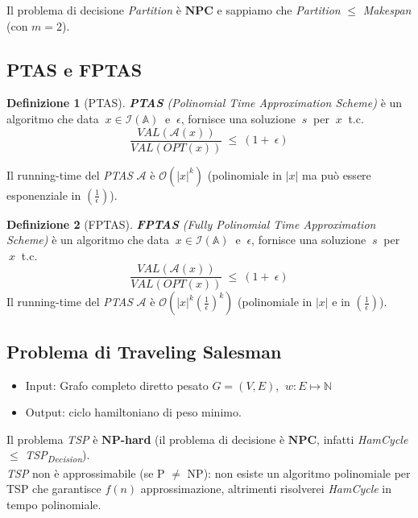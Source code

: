 \documentclass[a4paper]{article}
\theoremstyle{definition}
\newtheorem{definit}{Definizione}[subsection]
\newcommand{\N}{\mathbb{N}}
\newcommand{\np}{\mathbf{NP}}
\newcommand{\npc}{\mathbf{NPC}}
\begin{document}
	\noindent
	Il problema di decisione \textit{Partition} è $\npc$ e sappiamo che \textit{Partition} $\leq$ \textit{Makespan} (con $m=2$).
			
		\subsection{PTAS e FPTAS}
		
		\begin{definit}[PTAS]
			\textit{\textbf{PTAS} (Polinomial Time Approximation Scheme)} è un algoritmo che data $\ x\in \mathcal{I}(\mathbb{A}) \ $ e $\ \epsilon$, fornisce una soluzione $\ s\ $ per $\ x\ $ t.c.
			\[
				\dfrac{VAL(\mathcal{A}(x))}{VAL(OPT(x))}~\leq~(1+~\epsilon)
			\]
			
			Il running-time del \textit{PTAS} $\mathcal{A}$ è $\mathcal{O}(|x|^k)$ (polinomiale in $|x|$ ma può essere esponenziale in $(\frac{1}{\epsilon})$).
		\end{definit}
		\begin{definit}[FPTAS]
			\textit{\textbf{FPTAS} (Fully Polinomial Time Approximation Scheme)} è un algoritmo che data $\ x\in \mathcal{I}(\mathbb{A})\ $ e $\ \epsilon$, fornisce una soluzione $\ s\ $ per $\ x\ $ t.c.
			\[
				\dfrac{VAL(\mathcal{A}(x))}{VAL(OPT(x))}~\leq~(1+~\epsilon)
			\]
			Il running-time del \textit{PTAS} $\mathcal{A}$ è $\mathcal{O}(|x|^k (\frac{1}{\epsilon})^k)$ (polinomiale in $|x|$ e in $(\frac{1}{\epsilon})$).
		\end{definit}
		
		
		\subsection{Problema di Traveling Salesman}
			\begin{itemize}
				\item Input: Grafo completo diretto pesato $ G = (V, E) $, $ \ w : E \mapsto \N $
				\item Output: ciclo hamiltoniano di peso minimo.
			\end{itemize}
		
		\noindent
		Il problema \textit{TSP} è $\np$\textbf{-hard} (il problema di decisione è $\npc$, infatti \textit{HamCycle} $\leq$ \textit{TSP\textsubscript{Decision}}).\\
		\textit{TSP} non è approssimabile (se P $\neq$ NP): non esiste un algoritmo polinomiale per TSP che garantisce $f(n)$ approssimazione, altrimenti risolverei \textit{HamCycle} in tempo polinomiale.
		
\end{document}
